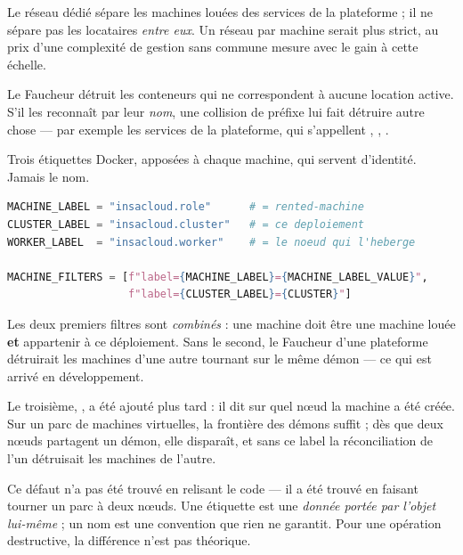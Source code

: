 \limite
Le réseau dédié sépare les machines louées des services de la plateforme ; il
ne sépare pas les locataires \emph{entre eux}. Un réseau par machine serait
plus strict, au prix d'une complexité de gestion sans commune mesure avec le
gain à cette échelle.


\menace
Le Faucheur détruit les conteneurs qui ne correspondent à aucune location
active. S'il les reconnaît par leur \emph{nom}, une collision de préfixe lui
fait détruire autre chose --- par exemple les services de la plateforme, qui
s'appellent , , .

\parade
Trois étiquettes Docker, apposées à chaque machine, qui servent d'identité.
Jamais le nom.

\danslecode
\begin{lstlisting}[language=Python]
MACHINE_LABEL = "insacloud.role"      # = rented-machine
CLUSTER_LABEL = "insacloud.cluster"   # = ce deploiement
WORKER_LABEL  = "insacloud.worker"    # = le noeud qui l'heberge

MACHINE_FILTERS = [f"label={MACHINE_LABEL}={MACHINE_LABEL_VALUE}",
                   f"label={CLUSTER_LABEL}={CLUSTER}"]
\end{lstlisting}

Les deux premiers filtres sont \emph{combinés} : une machine doit être une
machine louée \textbf{et} appartenir à ce déploiement. Sans le second, le
Faucheur d'une plateforme détruirait les machines d'une autre tournant sur le
même démon --- ce qui est arrivé en développement.

Le troisième, , a été ajouté plus tard : il dit sur quel
nœud la machine a été créée. Sur un parc de machines virtuelles, la frontière
des démons suffit ; dès que deux nœuds partagent un démon, elle disparaît, et
sans ce label la réconciliation de l'un détruisait les machines de l'autre.

\begin{retenir}
Ce défaut n'a pas été trouvé en relisant le code --- il a été trouvé en faisant
tourner un parc à deux nœuds. Une étiquette est une \emph{donnée portée par
l'objet lui-même} ; un nom est une convention que rien ne garantit. Pour une
opération destructive, la différence n'est pas théorique.
\end{retenir}

